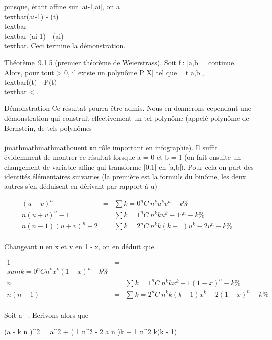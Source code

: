 puisque, \phi étant affine sur {[}ai-1,ai{]}, on a
\\textbar{}\phi(ai-1) -
\phi(t)\\textbar{} \leq\\textbar{}
\phi(ai-1) - \phi(ai)\\textbar{}. Ceci
termine la démonstration.

Théorème~9.1.5 (premier théorème de Weierstrass). Soit f : {[}a,b{]} \rightarrow~ 
continue. Alors, pour tout \epsilon \textgreater{} 0, il existe un polynôme P \in
\mathbb{C}{[}X{]} tel que \forall~~t \in {[}a,b{]},
\\textbar{}f(t) - P(t)\\textbar{}
\textless{} \epsilon.

Démonstration Ce résultat pourra être admis. Nous en donnerons cependant
une démonstration qui construit effectivement un tel polynôme (appelé
polynôme de Bernstein, de tels polynômes \\\\jmathmathmathmathouent un rôle important en
infographie). Il suffit évidemment de montrer ce résultat lorsque a = 0
et b = 1 (on fait ensuite un changement de variable affine qui
transforme {[}0,1{]} en {[}a,b{]}). Pour cela on part des identités
élémentaires suivantes (la première est la formule du binôme, les deux
autres s'en déduisent en dérivant par rapport à u)

\begin{align*} (u + v)^n& =&
\sum k=0^nC~
n^ku^kv^n-k \%&
\\ n(u + v)^n-1& =&
\sum k=1^nC~
n^kku^k-1v^n-k \%&
\\ n(n - 1)(u + v)^n-2& =&
\sum k=2^nC~
n^kk(k - 1)u^k-2v^n-k\%&
\\ \end{align*}

Changeant u en x et v en 1 - x, on en déduit que

\begin{align*} 1& =& \\sum
k=0^nC n^kx^k(1 -
x)^n-k \%& \\ n& =&
\sum k=1^nC~
n^kkx^k-1(1 - x)^n-k \%&
\\ n(n - 1)& =&
\sum k=2^nC~
n^kk(k - 1)x^k-2(1 - x)^n-k\%&
\\ \end{align*}

Soit a \in {}~. Ecrivons alors que

 \left (a - k \over n
\right )^2 = a^2 + ( 1
\over n^2 - 2 a \over n
)k + 1 \over n^2 k(k - 1)

